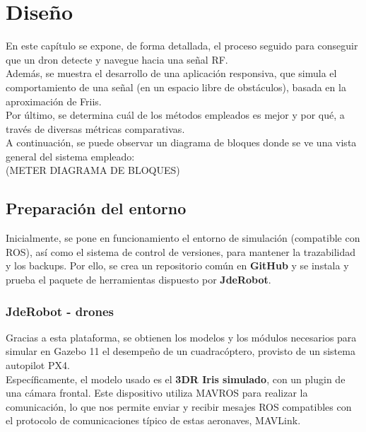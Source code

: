 \chapter{Diseño}
\label{cap:capitulo4}

En este capítulo se expone, de forma detallada, el proceso seguido para conseguir que un dron detecte y navegue hacia una señal \ac{RF}.\\

Además, se muestra el desarrollo de una aplicación responsiva, que simula el comportamiento de una señal (en un espacio libre de obstáculos), basada en la aproximación de Friis.\\

Por último, se determina cuál de los métodos empleados es mejor y por qué, a través de diversas métricas comparativas.\\

A continuación, se puede observar un diagrama de bloques donde se ve una vista general del sistema empleado:\\

(METER DIAGRAMA DE BLOQUES)\\

\section{Preparación del entorno}
\label{sec:preparacion_del_entorno}

Inicialmente, se pone en funcionamiento el entorno de simulación (compatible con \ac{ROS}), así como el sistema de control de versiones, para mantener la trazabilidad y los backups. Por ello, se crea un repositorio común en \textbf{GitHub} y se instala y prueba el paquete de herramientas dispuesto por \textbf{JdeRobot}.

\subsection{JdeRobot - drones}
\label{subsec:jderobot_drones}

Gracias a esta plataforma, se obtienen los modelos y los módulos necesarios para simular en Gazebo 11 el desempeño de un cuadracóptero, provisto de un sistema autopilot PX4.\\

Específicamente, el modelo usado es el \textbf{3DR Iris simulado}, con un plugin de una cámara frontal. Este dispositivo utiliza MAVROS para realizar la comunicación, lo que nos permite enviar y recibir mesajes ROS compatibles con el protocolo de comunicaciones típico de estas aeronaves, MAVLink.\\

